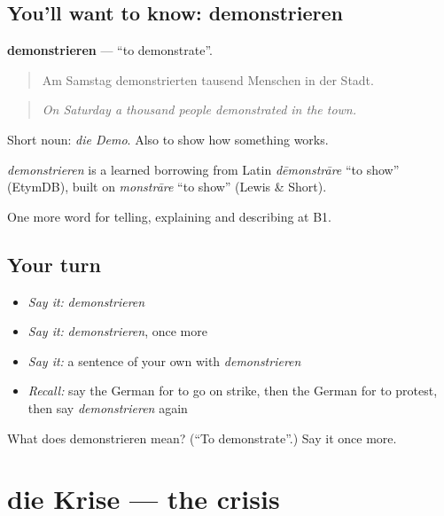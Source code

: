 \subsection*{You'll want to know: demonstrieren}
\textbf{demonstrieren} — \textquotedblleft{}to demonstrate\textquotedblright{}.

\begin{quote}
Am Samstag demonstrierten tausend Menschen in der Stadt.
\end{quote}

\begin{quote}
\emph{On Saturday a thousand people demonstrated in the town.}
\end{quote}

Short noun: \emph{die Demo}. Also to show how something works.

\begin{cousinweb}
\emph{demonstrieren} is a learned borrowing from Latin \emph{dēmonstrāre} \textquotedblleft{}to show\textquotedblright{} (EtymDB), built on \emph{monstrāre} \textquotedblleft{}to show\textquotedblright{} (Lewis \& Short).
\end{cousinweb}

\begin{grammarlens}[title={What you've built}]
One more word for telling, explaining and describing at B1.
\end{grammarlens}

\subsection*{Your turn}
\begin{itemize}
\raggedright
  \item \emph{Say it:} \emph{demonstrieren}
  \item \emph{Say it:} \emph{demonstrieren}, once more
  \item \emph{Say it:} a sentence of your own with \emph{demonstrieren}
  \item \emph{Recall:} say the German for to go on strike, then the German for to protest, then say \emph{demonstrieren} again
\end{itemize}

\begin{tcolorbox}[breakable,colback=teal!4,colframe=teal!35!black,title={Before you move on}]
What does demonstrieren mean? (\textquotedblleft{}To demonstrate\textquotedblright{}.) Say it once more.
\end{tcolorbox}
\section[die Krise]{die Krise — the crisis}

